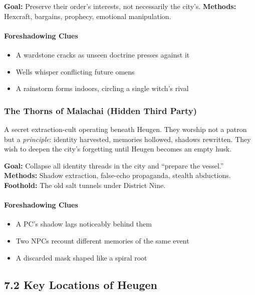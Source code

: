 \documentclass[11pt]{book}
\begin{document}
\textbf{Goal:} Preserve their order's interests, not necessarily the city's.  
\textbf{Methods:} Hexcraft, bargains, prophecy, emotional manipulation.

\paragraph{Foreshadowing Clues}
\begin{itemize}[leftmargin=*]
    \item A wardstone cracks as unseen doctrine presses against it  
    \item Wells whisper conflicting future omens  
    \item A rainstorm forms indoors, circling a single witch's rival
\end{itemize}

\subsubsection*{The Thorns of Malachai (Hidden Third Party)}

A secret extraction-cult operating beneath Heugen. They worship not a patron 
but a \emph{principle}: identity harvested, memories hollowed, shadows rewritten.
They wish to deepen the city's forgetting until Heugen becomes an empty husk.

\textbf{Goal:} Collapse all identity threads in the city and ``prepare the vessel.''  
\textbf{Methods:} Shadow extraction, false-echo propaganda, stealth abductions.  
\textbf{Foothold:} The old salt tunnels under District Nine.

\paragraph{Foreshadowing Clues}
\begin{itemize}[leftmargin=*]
    \item A PC's shadow lags noticeably behind them  
    \item Two NPCs recount different memories of the same event  
    \item A discarded mask shaped like a spiral root
\end{itemize}

\subsection{7.2 Key Locations of Heugen}
\end{document}
